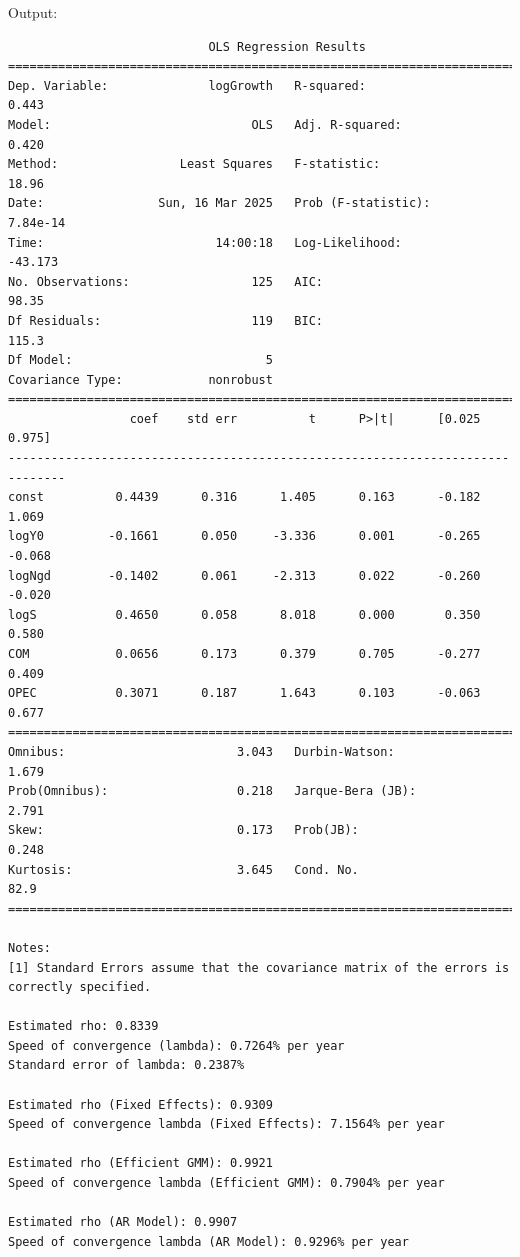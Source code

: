 \documentclass[10pt]{article}
\begin{document}

Output:
\begin{verbatim}
                            OLS Regression Results                            
==============================================================================
Dep. Variable:              logGrowth   R-squared:                       0.443
Model:                            OLS   Adj. R-squared:                  0.420
Method:                 Least Squares   F-statistic:                     18.96
Date:                Sun, 16 Mar 2025   Prob (F-statistic):           7.84e-14
Time:                        14:00:18   Log-Likelihood:                -43.173
No. Observations:                 125   AIC:                             98.35
Df Residuals:                     119   BIC:                             115.3
Df Model:                           5                                         
Covariance Type:            nonrobust                                         
==============================================================================
                 coef    std err          t      P>|t|      [0.025      0.975]
------------------------------------------------------------------------------
const          0.4439      0.316      1.405      0.163      -0.182       1.069
logY0         -0.1661      0.050     -3.336      0.001      -0.265      -0.068
logNgd        -0.1402      0.061     -2.313      0.022      -0.260      -0.020
logS           0.4650      0.058      8.018      0.000       0.350       0.580
COM            0.0656      0.173      0.379      0.705      -0.277       0.409
OPEC           0.3071      0.187      1.643      0.103      -0.063       0.677
==============================================================================
Omnibus:                        3.043   Durbin-Watson:                   1.679
Prob(Omnibus):                  0.218   Jarque-Bera (JB):                2.791
Skew:                           0.173   Prob(JB):                        0.248
Kurtosis:                       3.645   Cond. No.                         82.9
==============================================================================

Notes:
[1] Standard Errors assume that the covariance matrix of the errors is correctly specified.

Estimated rho: 0.8339
Speed of convergence (lambda): 0.7264% per year
Standard error of lambda: 0.2387%

Estimated rho (Fixed Effects): 0.9309
Speed of convergence lambda (Fixed Effects): 7.1564% per year

Estimated rho (Efficient GMM): 0.9921
Speed of convergence lambda (Efficient GMM): 0.7904% per year

Estimated rho (AR Model): 0.9907
Speed of convergence lambda (AR Model): 0.9296% per year
\end{verbatim}
\end{document}
